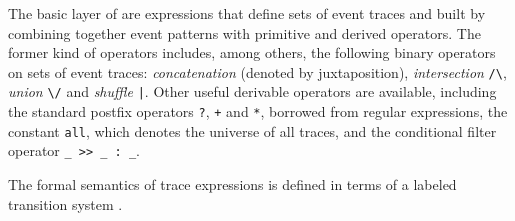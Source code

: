 The basic layer of \rml are expressions that define sets of event traces and built by combining together event patterns with primitive and derived operators.
The former kind of operators includes, among others, the following binary operators on sets of event traces: \emph{concatenation} (denoted by juxtaposition), \emph{intersection} \lstinline{/\}, \emph{union} \lstinline{\/} and \emph{shuffle} \lstinline{|}.
Other useful derivable operators are available, including the standard postfix operators
\lstinline{?}, \lstinline{+} and \lstinline{*}, borrowed from regular expressions,  the constant \lstinline{all}, which denotes the universe of all traces,
and the  conditional filter operator \lstinline{_ >> _ : _}.

The formal semantics of trace expressions is defined in terms of a labeled transition system \cite{RML2021}.

